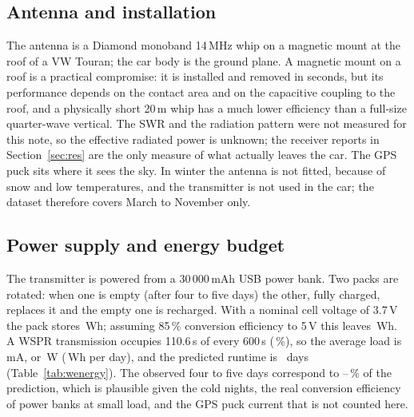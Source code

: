 \documentclass[10pt,a4paper]{article}
\begin{document}
\subsection{Antenna and installation}
The antenna is a Diamond monoband 14\,MHz whip on a magnetic mount at the roof of a VW Touran; the car body is the ground plane. A magnetic mount on a roof is a practical compromise: it is installed and removed in seconds, but its performance depends on the contact area and on the capacitive coupling to the roof, and a physically short 20\,m whip has a much lower efficiency than a full-size quarter-wave vertical. The SWR and the radiation pattern were not measured for this note, so the effective radiated power is unknown; the receiver reports in Section~\ref{sec:res} are the only measure of what actually leaves the car. The GPS puck sits where it sees the sky. In winter the antenna is not fitted, because of snow and low temperatures, and the transmitter is not used in the car; the dataset therefore covers March to November only.

\subsection{Power supply and energy budget}
The transmitter is powered from a 30\,000\,mAh USB power bank. Two packs are rotated: when one is empty (after four to five days) the other, fully charged, replaces it and the empty one is recharged. With a nominal cell voltage of 3.7\,V the pack stores \eCapWh\,Wh; assuming 85\,\% conversion efficiency to 5\,V this leaves \eUsable\,Wh. A WSPR transmission occupies 110.6\,s of every 600\,s (\wTxFrac\,\%), so the average load is \eAvgmA\,mA, or \eAvgW\,W (\eDaily\,Wh per day), and the predicted runtime is \eDays\ days (Table~\ref{tab:wenergy}). The observed four to five days correspond to \eImpliedLo--\eImpliedHi\,\% of the prediction, which is plausible given the cold nights, the real conversion efficiency of power banks at small load, and the GPS puck current that is not counted here.


\end{document}

